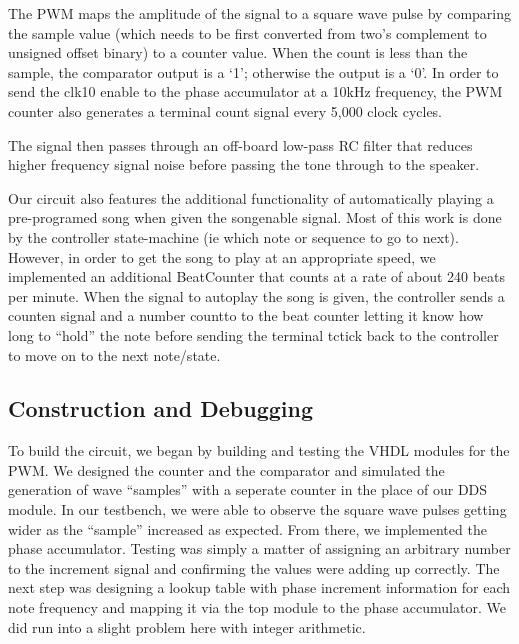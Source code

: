 \documentclass{article}
\begin{document}
    The PWM maps the amplitude of the signal to a square wave pulse by comparing the sample value (which needs to be first converted from two's complement to unsigned offset binary) to a counter value. When the count is less than the sample, the comparator output is a `1'; otherwise the output is a `0'. In order to send the clk10 enable to the phase accumulator at a 10kHz frequency, the PWM counter also generates a terminal count signal every 5,000 clock cycles. 

    The signal then passes through an off-board low-pass RC filter that reduces higher frequency signal noise before passing the tone through to the speaker.

    Our circuit also features the additional functionality of automatically playing a pre-programed song when given the song\textunderscore enable signal. Most of this work is done by the controller state-machine (ie which note or sequence to go to next). However, in order to get the song to play at an appropriate speed, we implemented an additional BeatCounter that counts at a rate of about 240 beats per minute. When the signal to autoplay the song is given, the controller sends a count\textunderscore en signal and a number count\textunderscore to to the beat counter letting it know how long to ``hold'' the note before sending the terminal tc\textunderscore tick back to the controller to move on to the next note/state.

  \subsection{Construction and Debugging}


    To build the circuit, we began by building and testing the VHDL modules for the PWM. We designed the counter and the comparator and simulated the generation of wave ``samples'' with a seperate counter in the place of our DDS module. In our testbench, we were able to observe the square wave pulses getting wider as the ``sample'' increased as expected. From there, we implemented the phase accumulator. Testing was simply a matter of assigning an arbitrary number to the increment signal and confirming the values were adding up correctly. The next step was designing a lookup table with phase increment information for each note frequency and mapping it via the top module to the phase accumulator. We did run into a slight problem here with integer arithmetic. 
\end{document}
